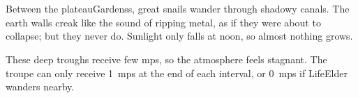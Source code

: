\section{}
\label{shadepaths}

Between the \glspl{plateauGardens}, great snails wander through shadowy canals.
The earth walls creak like the sound of ripping metal, as if they were about to collapse; but they never do.
Sunlight only falls at noon, so almost nothing grows.

These deep troughs receive few \glspl{mp}, so the atmosphere feels stagnant.
The troupe can only receive 1~\glspl{mp} at the end of each \gls{interval}, or 0~\glspl{mp} if \gls{LifeElder} wanders nearby.




